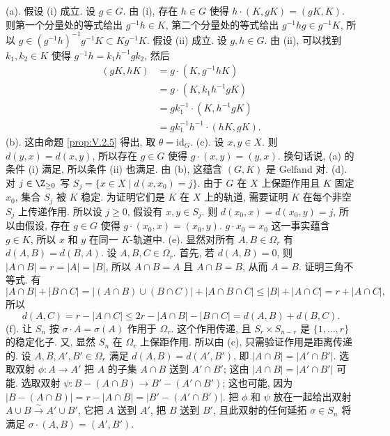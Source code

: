 \begin{solution}
(a). 假设 (i) 成立. 设 $g \in G$. 由 (i), 存在 $h \in G$ 使得 $h \cdot (K, gK) = (gK, K)$. 则第一个分量处的等式给出 $g^{-1}h \in K$, 第二个分量处的等式给出 $g^{-1}hg \in g^{-1}K$, 所以 $g \in (g^{-1}h)^{-1}g^{-1}K \subset Kg^{-1}K$.
假设 (ii) 成立. 设 $g, h \in G$. 由 (ii), 可以找到 $k_1, k_2 \in K$ 使得 $g^{-1}h = k_1h^{-1}gk_2$, 然后
\begin{align*}
(gK, hK) &= g \cdot (K, g^{-1}hK) \\
&= g \cdot (K, k_1h^{-1}gK) \\
&= gk_1^{-1} \cdot (K, h^{-1}gK) \\
&= gk_1^{-1}h^{-1} \cdot (hK, gK).
\end{align*}
(b). 这由命题 \ref{prop:V.2.5} 得出, 取 $\theta = \mathrm{id}_G$.
(c). 设 $x, y \in X$. 则 $d(y, x) = d(x, y)$, 所以存在 $g \in G$ 使得 $g \cdot (x, y) = (y, x)$. 换句话说, (a) 的条件 (i) 满足, 所以条件 (ii) 也满足. 由 (b), 这蕴含 $(G, K)$ 是 Gelfand 对.
(d). 对 $j \in \Z_{\geq 0}$ 写 $S_j = \{x \in X \mid d(x, x_0) = j\}$. 由于 $G$ 在 $X$ 上保距作用且 $K$ 固定 $x_0$, 集合 $S_j$ 被 $K$ 稳定. 为证明它们是 $K$ 在 $X$ 上的轨道, 需要证明 $K$ 在每个非空 $S_j$ 上传递作用. 所以设 $j \geq 0$, 假设有 $x, y \in S_j$. 则 $d(x_0, x) = d(x_0, y) = j$, 所以由假设, 存在 $g \in G$ 使得 $g \cdot (x_0, x) = (x_0, y)$. $g \cdot x_0 = x_0$ 这一事实蕴含 $g \in K$, 所以 $x$ 和 $y$ 在同一 $K$-轨道中.
(e). 显然对所有 $A, B \in \Omega_r$ 有 $d(A, B) = d(B, A)$. 设 $A, B, C \in \Omega_r$. 首先, 若 $d(A, B) = 0$, 则 $|A \cap B| = r = |A| = |B|$, 所以 $A \cap B = A$ 且 $A \cap B = B$, 从而 $A = B$. 证明三角不等式. 有
\[
|A \cap B| + |B \cap C| = |(A \cap B) \cup (B \cap C)| + |A \cap B \cap C| \leq |B| + |A \cap C| = r + |A \cap C|,
\]
所以
\[
d(A, C) = r - |A \cap C| \leq 2r - |A \cap B| - |B \cap C| = d(A, B) + d(B, C).
\]
(f). 让 $S_n$ 按 $\sigma \cdot A = \sigma(A)$ 作用于 $\Omega_r$. 这个作用传递, 且 $S_r \times S_{n-r}$ 是 $\{1, \ldots, r\}$ 的稳定化子. 又, 显然 $S_n$ 在 $\Omega_r$ 上保距作用. 所以由 (c), 只需验证作用是距离传递的. 设 $A, B, A', B' \in \Omega_r$ 满足 $d(A, B) = d(A', B')$, 即 $|A \cap B| = |A' \cap B'|$. 选取双射 $\phi \colon A \to A'$ 把 $A$ 的子集 $A \cap B$ 送到 $A' \cap B'$; 这由 $|A \cap B| = |A' \cap B'|$ 可能. 选取双射 $\psi \colon B - (A \cap B) \to B' - (A' \cap B')$; 这也可能, 因为 $|B - (A \cap B)| = r - |A \cap B| = |B' - (A' \cap B')|$. 把 $\phi$ 和 $\psi$ 放在一起给出双射 $A \cup B \xrightarrow{\sim} A' \cup B'$, 它把 $A$ 送到 $A'$, 把 $B$ 送到 $B'$, 且此双射的任何延拓 $\sigma \in S_n$ 将满足 $\sigma \cdot (A, B) = (A', B')$.
\end{solution}

